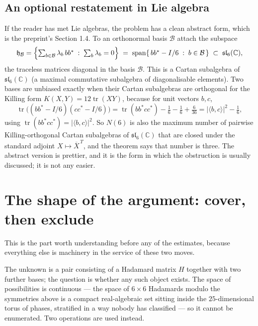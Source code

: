 \documentclass[11pt]{article}
\theoremstyle{definition}
\theoremstyle{plain}
\theoremstyle{definition}
\newcommand{\C}{\mathbb{C}}
\newcommand{\inner}[2]{\langle #1,#2\rangle}
\newcommand{\abs}[1]{\lvert #1\rvert}
\DeclareMathOperator{\tr}{tr}
\begin{document}
\subsection{An optional restatement in Lie algebra}

If the reader has met Lie algebras, the problem has a clean abstract form, which is the preprint's
Section 1.4. To an orthonormal basis $\mathcal B$ attach the subspace
\[
\mathfrak h_{\mathcal B}=\Bigl\{\textstyle\sum_{b\in\mathcal B}\lambda_b\,bb^* \;:\; \sum_b\lambda_b=0\Bigr\}
\;=\;\operatorname{span}\{\,bb^*-I/6 \;:\; b\in\mathcal B\,\}\;\subset\;\mathfrak{sl}_6(\C),
\]
the traceless matrices diagonal in the basis $\mathcal B$. This is a Cartan subalgebra of
$\mathfrak{sl}_6(\C)$ (a maximal commutative subalgebra of diagonalisable elements). Two bases are
unbiased exactly when their Cartan subalgebras are orthogonal for the Killing form $K(X,Y)=12\tr(XY)$,
because for unit vectors $b,c$,
\begin{equation}\label{eq:killing}
\tr\bigl((bb^*-I/6)(cc^*-I/6)\bigr)
=\tr(bb^*cc^*)-\tfrac16-\tfrac16+\tfrac{6}{36}
=\abs{\inner{b}{c}}^2-\tfrac16 ,
\end{equation}
using $\tr(bb^*cc^*)=\abs{\inner{b}{c}}^2$. So $N(6)$ is also the maximum number of pairwise
Killing-orthogonal Cartan subalgebras of $\mathfrak{sl}_6(\C)$ that are closed under the standard
adjoint $X\mapsto \overline{X}^{\,T}$, and the theorem says that number is three. The abstract version
is prettier, and it is the form in which the obstruction is usually discussed; it is not any easier.

\section{The shape of the argument: cover, then exclude}\label{sec:shape}

This is the part worth understanding before any of the estimates, because everything else is
machinery in the service of these two moves.

The unknown is a pair consisting of a Hadamard matrix $H$ together with two further bases; the
question is whether any such object exists. The space of possibilities is continuous --- the space of
$6\times6$ Hadamards modulo the symmetries above is a compact real-algebraic set sitting inside the
$25$-dimensional torus of phases, stratified in a way nobody has classified --- so it cannot be
enumerated. Two operations are used instead.
\end{document}
